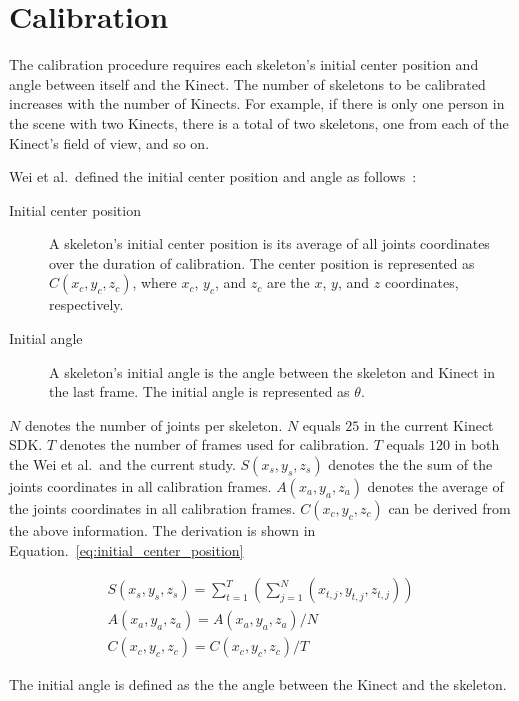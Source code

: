 \section{Calibration}
\label{sec:current_approach_calibration}

The calibration procedure requires each skeleton's initial center position and angle between itself and the Kinect. The number of skeletons to be calibrated increases with the number of Kinects. For example, if there is only one person in the scene with two Kinects, there is a total of two skeletons, one from each of the Kinect's field of view, and so on.

Wei et al.\ defined the initial center position and angle as follows~\cite{wei_kinect_calibration}:

\begin{description}
  \item[Initial center position] A skeleton's initial center position is its average of all joints coordinates over the duration of calibration. The center position is represented as $C(x_c, y_c, z_c)$, where $x_c$, $y_c$, and $z_c$ are the $x$, $y$, and $z$ coordinates, respectively.
  \item[Initial angle] A skeleton's initial angle is the angle between the skeleton and Kinect in the last frame. The initial angle is represented as $\theta$.
\end{description}

$N$ denotes the number of joints per skeleton. $N$ equals $25$ in the current Kinect SDK. $T$ denotes the number of frames used for calibration. $T$ equals $120$ in both the Wei et al.\ and the current study. $S(x_s, y_s, z_s)$ denotes the the sum of the joints coordinates in all calibration frames. $A(x_a, y_a, z_a)$ denotes the average of the joints coordinates in all calibration frames. $C(x_c, y_c, z_c)$ can be derived from the above information. The derivation is shown in Equation.~\ref{eq:initial_center_position}

\begin{equation}
\label{eq:initial_center_position}
\begin{gathered}
S(x_s, y_s, z_s) = \sum_{t=1}^T (\sum_{j=1}^N (x_{t,j}, y_{t,j}, z_{t,j})) \\
A(x_a, y_a, z_a) = A(x_a, y_a, z_a) / N \\
C(x_c, y_c, z_c) = C(x_c, y_c, z_c) / T
\end{gathered}
\end{equation}

The initial angle is defined as the the angle between the Kinect and the skeleton.


